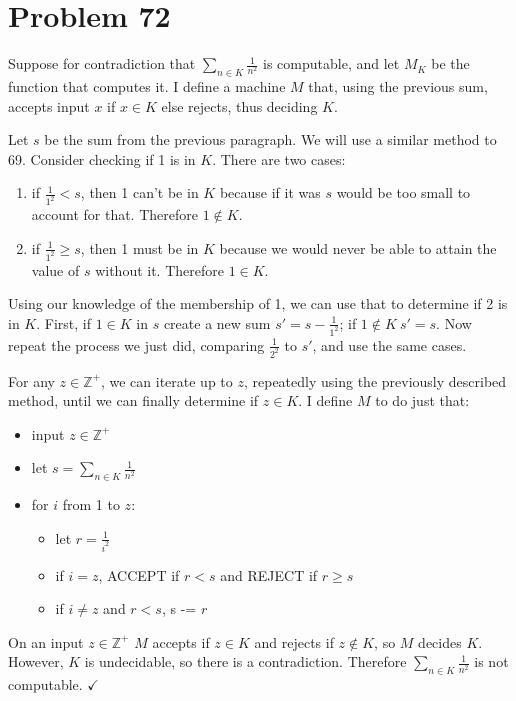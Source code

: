 \documentclass[11pt]{article}
\begin{document}
\section*{Problem 72}

Suppose for contradiction that $\sum _{n \in K} \frac{1}{n^2}$ is computable, and let $M_K$ be the function that computes it.
I define a machine $M$ that, using the previous sum, accepts input $x$ if $x \in K$ else rejects, thus deciding $K$.

Let $s$ be the sum from the previous paragraph.
We will use a similar method to 69.
Consider checking if 1 is in $K$. There are two cases:
\begin{enumerate}
	\item if $\frac{1}{1^2} < s$, then 1 can't be in $K$ because if it was $s$ would be too small to account for that. 
	Therefore $1 \notin K$.
	\item if $\frac{1}{1^2} \geq s$, then 1 must be in $K$ because we would never be able to attain the value of $s$ without it.
	Therefore $1 \in K$.
\end{enumerate}
Using our knowledge of the membership of 1, we can use that to determine if 2 is in $K$.
First, if $1 \in K$ in $s$ create a new sum $s' = s - \frac{1}{1^2}$; if $1 \notin K\ s' = s$.
Now repeat the process we just did, comparing $\frac{1}{2^2}$ to $s'$, and use the same cases.

For any $z \in \mathbb{Z}^+$, we can iterate up to $z$, repeatedly using the previously described method, until we can finally determine if $z \in K$.
I define $M$ to do just that:
\begin{itemize}
	\item input $z \in \mathbb{Z}^+$
	\item let $s = \sum _{n\in K} \frac{1}{n^2}$
	\item for $i$ from 1 to $z$:
	\begin{itemize}
		\item let $r = \frac{1}{i^2}$
		\item if $i = z$, ACCEPT if $r < s$ and REJECT if $r \geq s$
		\item if $i \neq z$ and $r < s$, s -= $r$
	\end{itemize}
\end{itemize}

On an input $z \in \mathbb{Z}^+$ $M$ accepts if $z \in K$ and rejects if $z \notin K$, so $M$ decides $K$.
However, $K$ is undecidable, so there is a contradiction.
Therefore $\sum _{n \in K} \frac{1}{n^2}$ is not computable. $\checkmark$
\end{document}
